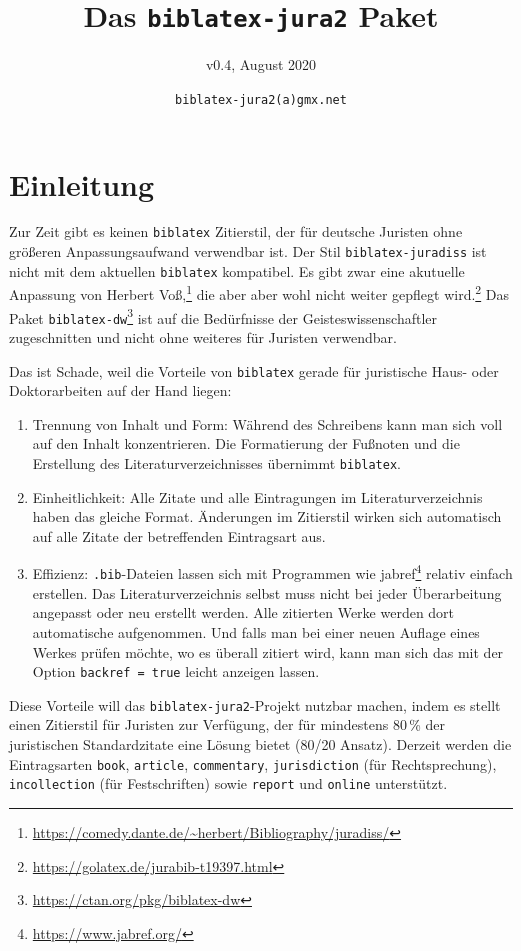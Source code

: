 \documentclass[headings=small,numbers=noenddot, 12pt,oneside]{scrartcl}
\title{Das \texttt{biblatex-jura2} Paket}
\subtitle{v0.4,  August 2020}
\author{\texttt{biblatex-jura2(a)gmx.net}}
\date{}
\newcommand\fnurl[1]{\footnote{\url{#1}}}
\begin{document}
\maketitle
\tableofcontents
\pagebreak
\section{Einleitung}
\label{Einleitung}

Zur Zeit gibt es keinen \texttt{biblatex} Zitierstil, der für deutsche Juristen ohne größeren Anpassungsaufwand verwendbar ist. Der Stil \texttt{biblatex-juradiss} ist nicht mit dem aktuellen \texttt{biblatex} kompatibel. Es gibt zwar eine akutuelle Anpassung von Herbert Voß,\fnurl{https://comedy.dante.de/~herbert/Bibliography/juradiss/} die aber aber wohl nicht weiter gepflegt wird.\fnurl{https://golatex.de/jurabib-t19397.html} Das Paket \texttt{biblatex-dw}\fnurl{https://ctan.org/pkg/biblatex-dw} ist auf die Bedürfnisse der Geisteswissenschaftler zugeschnitten und nicht ohne weiteres für Juristen verwendbar.

Das ist Schade, weil die Vorteile von \texttt{biblatex} gerade für juristische Haus- oder Doktorarbeiten auf der Hand liegen:

\begin{enumerate}
    \item Trennung von Inhalt und Form: Während des Schreibens kann man sich voll auf den Inhalt konzentrieren. Die Formatierung der Fußnoten und die Erstellung des Literaturverzeichnisses übernimmt \texttt{biblatex}.
    \item Einheitlichkeit: Alle Zitate und alle Eintragungen im Literaturverzeichnis haben das gleiche Format. Änderungen im Zitierstil wirken sich automatisch auf alle Zitate der betreffenden Eintragsart aus.
    \item Effizienz: \texttt{.bib}-Dateien lassen sich mit Programmen wie jabref\fnurl{https://www.jabref.org/} relativ einfach erstellen. Das Literaturverzeichnis selbst muss nicht bei jeder Überarbeitung  angepasst oder neu erstellt werden. Alle zitierten Werke werden dort automatische aufgenommen. Und falls man bei einer neuen Auflage eines Werkes prüfen möchte, wo es überall zitiert wird, kann man sich das mit der Option \texttt{backref = true} leicht anzeigen lassen.
\end{enumerate}
\noindent
Diese Vorteile will das \texttt{biblatex-jura2}-Projekt nutzbar machen, indem es stellt einen Zitierstil für Juristen zur Verfügung, der für mindestens 80\,\% der juristischen Standardzitate eine Lösung bietet (80/20 Ansatz). Derzeit werden die Eintragsarten \texttt{book}, \texttt{article},  \texttt{commentary}, \texttt{jurisdiction} (für Rechtsprechung), \texttt{incollection} (für Festschriften) sowie \texttt{report} und \texttt{online} unterstützt.
\end{document}
